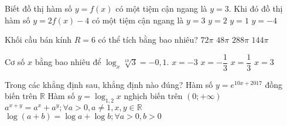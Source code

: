 \begin{ex}%
Biết đồ thị hàm số $y = f(x)$ có một tiệm cận ngang là $y = 3$. Khi đó đồ thị hàm số $y = 2f(x) - 4$ có một tiệm cận ngang là 
\choice
{$y = 3$}
{\True $y = 2$}
{$y = 1$}
{$y = - 4$}
\end{ex}
\begin{ex}%
Khối cầu bán kính $R = 6$ có thể tích bằng bao nhiêu? 
\choice
{$72\pi $}
{$48\pi $}
{\True $288\pi $}
{$144\pi $}
\end{ex}
\begin{ex}%
Cơ số $x$ bằng bao nhiêu để $\log_x\sqrt[10]{3} = - 0{,}1$. 
\choice
{$x = - 3$}
{$x = - \dfrac{1}{3}$}
{\True $x = \dfrac{1}{3}$}
{$x = 3$}
\end{ex}
\begin{ex}%
Trong các khẳng định sau, khẳng định nào đúng? 
\choice
{\True Hàm số $y = e^{10x + 2017}$ đồng biến trên $\mathbb{R}$}
{Hàm số $y = \log_{1,2}x$ nghịch biến trên $(0; + \infty)$}
{$a^{x + y} = a^x + a^y; \forall a > 0, a\ne 1, x, y\in \mathbb{R}$}
{$\log (a + b) = \log a + \log b; \forall a > 0, b > 0$}
\end{ex}
